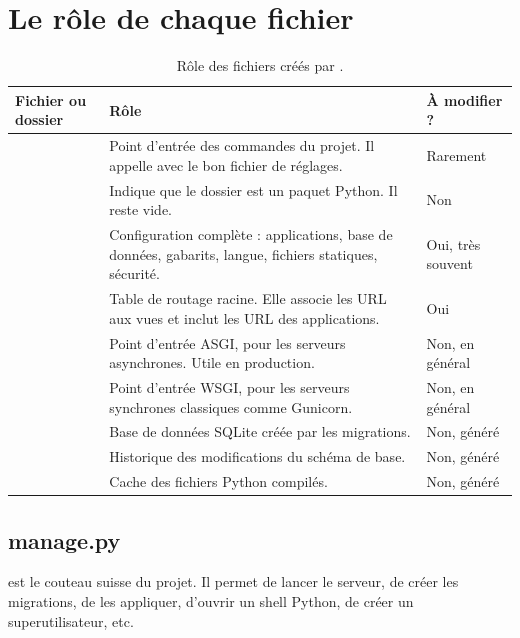 \section{Le rôle de chaque fichier}

\begin{table}[htbp]
\centering
\small
\begin{tabularx}{\textwidth}{L{4.1cm} X C{2.1cm}}
\toprule
\textbf{Fichier ou dossier} & \textbf{Rôle} & \textbf{À modifier ?} \\
\midrule
{} & Point d'entrée des commandes du projet. Il appelle
 avec le bon fichier de réglages. & Rarement \\
 & Indique que le dossier est un paquet Python.
Il reste vide. & Non \\
 & Configuration complète : applications, base de
données, gabarits, langue, fichiers statiques, sécurité. & Oui, très souvent \\
 & Table de routage racine. Elle associe les URL aux vues
et inclut les URL des applications. & Oui \\
 & Point d'entrée ASGI, pour les serveurs asynchrones.
Utile en production. & Non, en général \\
 & Point d'entrée WSGI, pour les serveurs synchrones
classiques comme Gunicorn. & Non, en général \\
 & Base de données SQLite créée par les migrations. & Non, généré \\
 & Historique des modifications du schéma de base. & Non, généré \\
 & Cache des fichiers Python compilés. & Non, généré \\
\bottomrule
\end{tabularx}
\caption{Rôle des fichiers créés par .}
\end{table}

\subsection{manage.py}

 est le couteau suisse du projet. Il permet de lancer le serveur,
de créer les migrations, de les appliquer, d'ouvrir un shell Python, de créer un
superutilisateur, etc.

